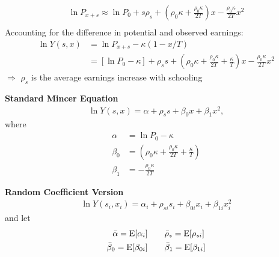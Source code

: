 \begin{frame}
 \begin{align*}
 \ln{P_{x + s}}  \approx \ln{P_0} + s\rho_s + \left(\rho_0 \kappa + \frac{\rho_0\kappa}{2T}\right)x - \frac{\rho_0\kappa}{2T} x^2 \\
 \end{align*}
Accounting for the difference in potential and observed earnings:
\begin{align*}
\ln{Y(s, x)} & = \ln{P_{x + s}} - \kappa\left(1 - x/T\right) \\
            & = [\ln{P_0} - \kappa] + \rho_s s + \left(\rho_0\kappa + \frac{\rho_0\kappa}{2T} + \frac{\kappa}{T}\right) x - \frac{\rho_0\kappa}{2T}x^2
\end{align*}
$\Rightarrow$ $\rho_s$ is the average earnings increase with schooling
\end{frame}
\begin{frame}
\textbf{Standard Mincer Equation}
\begin{align*}
\ln Y(s, x) = \alpha + \rho_s s + \beta_0 x + \beta_1 x^2,
\end{align*}
where
\begin{align*}
\alpha & =\ln{P_0} - \kappa \\
\beta_0 & = \left(\rho_0\kappa + \frac{\rho_0\kappa}{2T} + \frac{\kappa}{T}\right) \\
\beta_1 & = -\frac{\rho_0\kappa}{2T}
\end{align*}
\end{frame}
\begin{frame}
\textbf{Random Coefficient Version}
\begin{align*}
\ln{Y(s_i, x_i)} = \alpha_{i} + \rho_{si} s_i + \beta_{0i} x_i + \beta_{1i} x_i^2
\end{align*}
and let
\begin{align*}
\bar{\alpha} = \mathrm{E}[\alpha_i] &\qquad \bar{\rho}_s = \mathrm{E}[\rho_{si}]\\
\bar{\beta}_0 = \mathrm{E}[\beta_{0i}]&\qquad \bar{\beta}_1 = \mathrm{E}[\beta_{1i}]
\end{align*}
\end{frame}
